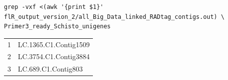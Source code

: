 \documentclass{article}\usepackage[]{graphicx}\usepackage[]{color}
\begin{document}
\begin{command}
\captionsetup{type=command}
\begin{Verbatim} 
grep -vxf <(awk '{print $1}' flR_output_version_2/all_Big_Data_linked_RADtag_contigs.out) \
Primer3_ready_Schisto_unigenes
\end{Verbatim}
\caption{\small Command that determines the ID of \textit{Schistocerca} unigenes that have been detected by the old version of \texttt{find\_linked\_RADtags.pl} but not with the new version. The command prints out lines from the second file (Primer3\_ready\_Schisto\_unigenes) that have not been matched by the patterns (here: unigene ID's) in the first "file": <(...). I need to provide a file to the "-f" switch of \texttt{grep}, but I only want to present the first column of all\_Big\_Data\_linked\_RADtag\_contigs.out as patterns. So I am using a \href{http://www.vincebuffalo.com/2013/08/08/the-mighty-named-pipe.html}{process substitution} with \texttt{<(...)} instead of an intermediate file.}
\label{process-subst}
\end{command}

\begin{table}[h]
\hspace{20pt}
\begin{tabular}{ll}
\toprule
     1	& LC.1365.C1.Contig1509 \\
     2	& LC.3754.C1.Contig3884 \\
     3	& LC.689.C1.Contig803 \\
\bottomrule
\end{tabular}
\end{table}
\end{document}
